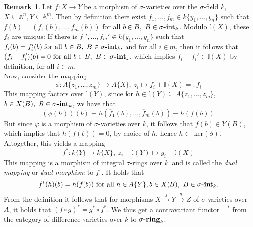 \documentclass{article}
\def\I{\mathbb{I}}
\def\s{\sigma}
\def\fa{\text{ for all }}
\newcommand{\catname}[1]{{\normalfont\textbf{#1}}}
\newcommand{\sintk}{\s\text{\catname{-int}}_k}
\newcommand{\sringk}{\s\text{\catname{-ring}}_k}
\theoremstyle{plain}
\theoremstyle{definition}
\newtheorem{rem}[Satz]{Remark}
\begin{document}
\begin{rem}\label{dualmor}
Let $f: X \rightarrow Y$ be a morphism of $\s$-varieties over the $\s$-field $k$, $X \subseteq \mathbb{A}^n, Y \subseteq \mathbb{A}^m$. Then by definition there exist $f_1, \ldots, f_m \in k\{y_1,\ldots,y_n\}$ such 
that $f(b) = (f_1(b),\ldots,f_m(b))$ for all $b \in B, ~ B \in \sintk$. Modulo $\I(X)$, these $f_i$ are unique:
 If there is $f_1', \ldots, f_m' \in k\{y_1,\ldots,y_n\}$ such that $f_i(b) = f'_i(b) \fa b \in B, ~ B \in \sintk,$ and for all $i \in \underline{m}$,
then it follows that $(f_i - f_i')(b) = 0 \fa b \in B, ~ B \in \sintk$, which implies $f_i - f_i' \in \I(X)$ by definition, for all $i \in \underline{m}$. \\
\indent Now, consider the mapping \[ \phi: A\{z_1,\ldots,z_m \} \rightarrow A\{X\}, ~ z_i \mapsto f_i + \I(X) =: \overline{f_i} \]
This mapping factors over $\I(Y)$, since for $h \in \I(Y) \subseteq A\{z_1,\ldots,z_m\}$, $b \in X(B), ~ B \in \sintk$, we have that 
\[ (\phi(h))(b) = h(\overline f_1(b), \ldots, \overline f_m(b)) = h(f(b)) \]
But since $\varphi$ is a morphism of $\s$-varieties over $k$, it follows that $f(b) \in Y(B)$, which implies that $h(f(b)) = 0$, by choice of $h$, hence $h \in $ ker$(\phi)$.
Altogether, this yields a mapping 
\[ f^* : k\{Y\} \rightarrow k\{X\}, ~ z_i + \I(Y) \mapsto y_i + \I(X) \]
This mapping is a morphism of integral $\s$-rings over $k$, and is called the \emph{dual mapping} or \emph{dual morphism} to $f$ . It holds that
\[ f^*(h)(b) = h(f(b)) \fa h \in A\{Y\}, b \in X(B), ~ B \in \sintk. \]
From the definition it follows that for morphisms $X \xrightarrow{f} Y \xrightarrow{g} Z$ of $\s$-varieties over $A$, it holds that $ (f \circ g)^* = g^* \circ f^*$. 
We thus get a contravariant functor $-^*$ from the category of difference varieties over $k$ to $\sringk$.
\end{rem}
\end{document}
